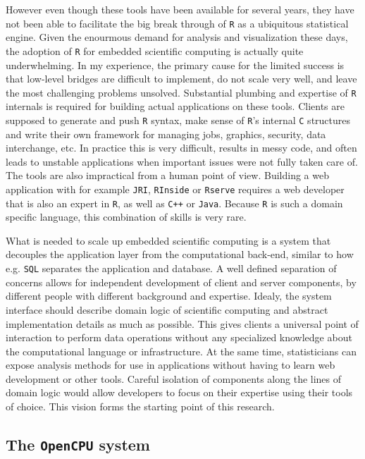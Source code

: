 \documentclass{article}
\newcommand{\R}{\texttt{R}\xspace}
\newcommand{\OpenCPU}{\texttt{OpenCPU}\xspace}
\begin{document}
However even though these tools have been available for several years, they have not been able to facilitate the big break through of \R as a ubiquitous statistical engine. Given the enourmous demand for analysis and visualization these days, the adoption of \R for embedded scientific computing is actually quite underwhelming. In my experience, the primary cause for the limited success is that low-level bridges are difficult to implement, do not scale very well, and leave the most challenging problems unsolved. Substantial plumbing and expertise of \R internals is required for building actual applications on these tools. Clients are supposed to generate and push \R syntax, make sense of \R's internal \texttt{C} structures and write their own framework for managing jobs, graphics, security, data interchange, etc. In practice this is very difficult, results in messy code, and often leads to unstable applications when important issues were not fully taken care of. The tools are also impractical from a human point of view. Building a web application with for example \texttt{JRI}, \texttt{RInside} or \texttt{Rserve} requires a web developer that is also an expert in \R, as well as \texttt{C++} or \texttt{Java}. Because \R is such a domain specific language, this combination of skills is very rare. 

What is needed to scale up embedded scientific computing is a system that decouples the application layer from the computational back-end, similar to how e.g. \texttt{SQL} separates the application and database. A well defined separation of concerns allows for independent development of client and server components, by different people with different background and expertise. Idealy, the system interface should describe domain logic of scientific computing and abstract implementation details as much as possible. This gives clients a universal point of interaction to perform data operations without any specialized knowledge about the computational language or infrastructure. At the same time, statisticians can expose analysis methods for use in applications without having to learn web development or other tools. Careful isolation of components along the lines of domain logic would allow developers to focus on their expertise using their tools of choice. This vision forms the starting point of this research. 


\subsection{The \OpenCPU system}
\end{document}
